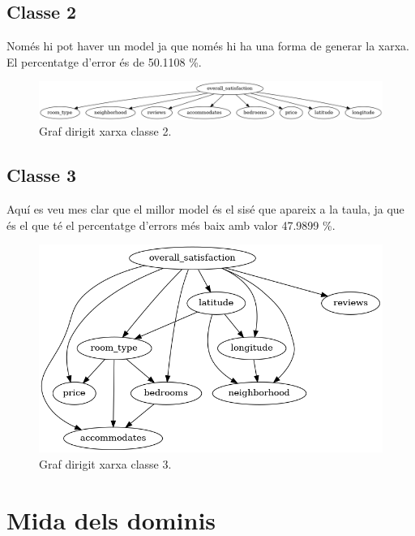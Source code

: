 \documentclass{article}
\begin{document}
\subsection{Classe 2}
Només hi pot haver un model ja que només hi ha una forma de generar la xarxa. El percentatge d'error és de 50.1108 \%.
\begin{figure}[H]
  \includegraphics[width=\linewidth]{classe2.png}
  \caption{Graf dirigit xarxa classe 2.}
  \label{fig:gp2}
\end{figure}
\newpage
\subsection{Classe 3}
Aquí es veu mes clar que el millor model és el sisé que apareix a la taula, ja que és el que té el percentatge d'errors més baix amb valor 47.9899 \%.
\begin{figure}[H]
  \includegraphics[width=\linewidth]{classe3.png}
  \caption{Graf dirigit xarxa classe 3.}
  \label{fig:gp3}
\end{figure}

\section{Mida dels dominis}
\end{document}
